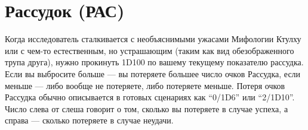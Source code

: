 \documentclass[letterpaper,twocolumn,openany, twoside, 11pt, usenames]{cocbook}
\newlength{\seplinewidth}
\newlength{\seplinesep}
\newcommand*{\sepline}{%
  \par
  \vspace{\dimexpr\seplinesep+.5\parskip}%
  \cleaders\vbox{%
    \begingroup %
      \color{sepline}%
      \hrule width\linewidth height\seplinewidth
    \endgroup
  }\vskip\seplinewidth
  \vspace{\dimexpr\seplinesep-.5\parskip}%
}
\begin{document}
\section*{Рассудок (РАС)}

Когда исследователь сталкивается с необъяснимыми ужасами Мифологии Ктулху или с чем-то естественным, но устрашающим (таким как вид обезображенного трупа друга), нужно прокинуть 1D100 по вашему текущему показателю рассудка. Если вы выбросите больше --- вы потеряете большее число очков Рассудка, если меньше --- либо вообще не потеряете, либо потеряете меньше. Потеря очков Рассудка обычно описывается в готовых сценариях как ``0/1D6'' или ``2/1D10''. Число слева от слеша говорит о том, сколько вы потеряете в случае успеха, а справа --- сколько потеряете в случае неудачи.

\end{document}
